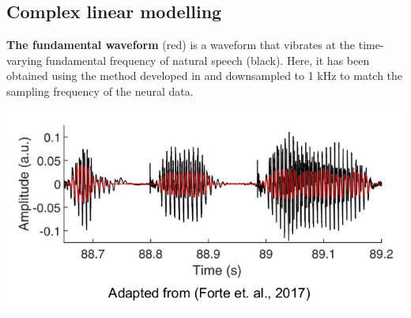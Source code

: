\documentclass[a0,landscape]{a0poster}
\newenvironment{Figure}
  {\par\medskip\noindent\minipage{\linewidth}}
  {\endminipage\par\medskip}
\begin{document}
\begin{multicols*}{3}
\subsection*{Complex linear modelling}
\begin{Figure}
  \begin{flushleft}
\textbf{The fundamental waveform} (red) is a waveform that vibrates at the time-varying fundamental frequency of natural speech (black). Here, it has been obtained using the method developed in \cite{Forte2017b} and downsampled to 1 kHz to match the sampling frequency of the neural data.
  \end{flushleft}
\endminipage\hfill
{}%
  \centering
  \includegraphics[width=\textwidth,keepaspectratio]{fundamental.png}
\endminipage



\end{Figure}
\end{multicols*}
\end{document}
